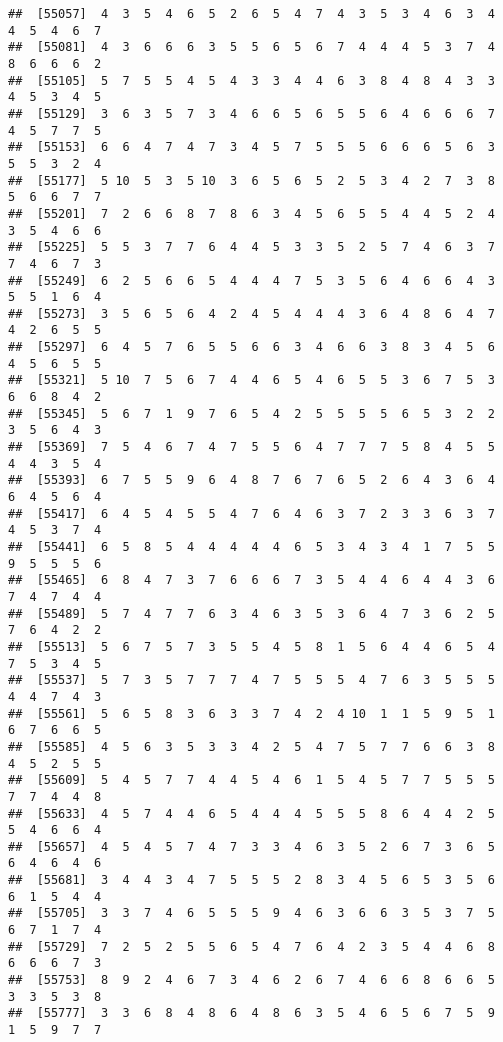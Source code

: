 \documentclass[
]{book}
\begin{document}
\begin{verbatim}
##  [55057]  4  3  5  4  6  5  2  6  5  4  7  4  3  5  3  4  6  3  4  4  5  4  6  7
##  [55081]  4  3  6  6  6  3  5  5  6  5  6  7  4  4  4  5  3  7  4  8  6  6  6  2
##  [55105]  5  7  5  5  4  5  4  3  3  4  4  6  3  8  4  8  4  3  3  4  5  3  4  5
##  [55129]  3  6  3  5  7  3  4  6  6  5  6  5  5  6  4  6  6  6  7  4  5  7  7  5
##  [55153]  6  6  4  7  4  7  3  4  5  7  5  5  5  6  6  6  5  6  3  5  5  3  2  4
##  [55177]  5 10  5  3  5 10  3  6  5  6  5  2  5  3  4  2  7  3  8  5  6  6  7  7
##  [55201]  7  2  6  6  8  7  8  6  3  4  5  6  5  5  4  4  5  2  4  3  5  4  6  6
##  [55225]  5  5  3  7  7  6  4  4  5  3  3  5  2  5  7  4  6  3  7  7  4  6  7  3
##  [55249]  6  2  5  6  6  5  4  4  4  7  5  3  5  6  4  6  6  4  3  5  5  1  6  4
##  [55273]  3  5  6  5  6  4  2  4  5  4  4  4  3  6  4  8  6  4  7  4  2  6  5  5
##  [55297]  6  4  5  7  6  5  5  6  6  3  4  6  6  3  8  3  4  5  6  4  5  6  5  5
##  [55321]  5 10  7  5  6  7  4  4  6  5  4  6  5  5  3  6  7  5  3  6  6  8  4  2
##  [55345]  5  6  7  1  9  7  6  5  4  2  5  5  5  5  6  5  3  2  2  3  5  6  4  3
##  [55369]  7  5  4  6  7  4  7  5  5  6  4  7  7  7  5  8  4  5  5  4  4  3  5  4
##  [55393]  6  7  5  5  9  6  4  8  7  6  7  6  5  2  6  4  3  6  4  6  4  5  6  4
##  [55417]  6  4  5  4  5  5  4  7  6  4  6  3  7  2  3  3  6  3  7  4  5  3  7  4
##  [55441]  6  5  8  5  4  4  4  4  4  6  5  3  4  3  4  1  7  5  5  9  5  5  5  6
##  [55465]  6  8  4  7  3  7  6  6  6  7  3  5  4  4  6  4  4  3  6  7  4  7  4  4
##  [55489]  5  7  4  7  7  6  3  4  6  3  5  3  6  4  7  3  6  2  5  7  6  4  2  2
##  [55513]  5  6  7  5  7  3  5  5  4  5  8  1  5  6  4  4  6  5  4  7  5  3  4  5
##  [55537]  5  7  3  5  7  7  7  4  7  5  5  5  4  7  6  3  5  5  5  4  4  7  4  3
##  [55561]  5  6  5  8  3  6  3  3  7  4  2  4 10  1  1  5  9  5  1  6  7  6  6  5
##  [55585]  4  5  6  3  5  3  3  4  2  5  4  7  5  7  7  6  6  3  8  4  5  2  5  5
##  [55609]  5  4  5  7  7  4  4  5  4  6  1  5  4  5  7  7  5  5  5  7  7  4  4  8
##  [55633]  4  5  7  4  4  6  5  4  4  4  5  5  5  8  6  4  4  2  5  5  4  6  6  4
##  [55657]  4  5  4  5  7  4  7  3  3  4  6  3  5  2  6  7  3  6  5  6  4  6  4  6
##  [55681]  3  4  4  3  4  7  5  5  5  2  8  3  4  5  6  5  3  5  6  6  1  5  4  4
##  [55705]  3  3  7  4  6  5  5  5  9  4  6  3  6  6  3  5  3  7  5  6  7  1  7  4
##  [55729]  7  2  5  2  5  5  6  5  4  7  6  4  2  3  5  4  4  6  8  6  6  6  7  3
##  [55753]  8  9  2  4  6  7  3  4  6  2  6  7  4  6  6  8  6  6  5  3  3  5  3  8
##  [55777]  3  3  6  8  4  8  6  4  8  6  3  5  4  6  5  6  7  5  9  1  5  9  7  7

\end{verbatim}
\end{document}
